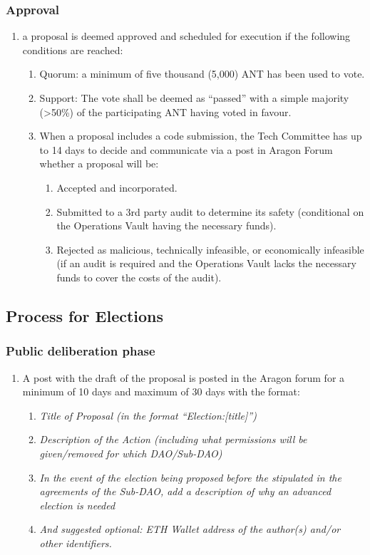 \subsubsection*{Approval} 
\begin{enumerate}
	\item a proposal is deemed approved and scheduled for execution if the following conditions are reached:
	\begin{enumerate}
		\item Quorum: a minimum of five thousand (5,000) \ac{ANT} has been used to vote.
		\item  Support: The vote shall be deemed as “passed” with a simple majority (>50\%) of the participating \ac{ANT} having voted in favour.
		\item When a proposal includes a code submission, the Tech Committee has up to 14 days to decide and communicate via a post in Aragon Forum whether a proposal will be:
		\begin{enumerate}
			\item Accepted and incorporated.
			\item Submitted to a 3rd party audit to determine its safety (conditional on the Operations Vault having the necessary funds).
			\item Rejected as malicious, technically infeasible, or economically infeasible (if an audit is required and the Operations Vault lacks the necessary funds to cover the costs of the audit).
		\end{enumerate}
	\end{enumerate}
\end{enumerate}


\subsection{Process for Elections}

\subsubsection*{Public deliberation phase} 
\begin{enumerate}
	\item A post with the draft of the proposal is posted in the Aragon forum for a minimum of 10 days and maximum of 30 days with the format:
	\begin{enumerate}
		\item \textit{Title of Proposal (in the format “Election:[title]”)}
		\item \textit{Description of the Action (including what permissions will be given/removed for which \ac{DAO}/Sub-\ac{DAO})}
		\item \textit{In the event of the election being proposed before the stipulated in the agreements of the Sub-\ac{DAO}, add a description of why an advanced election is needed}
		\item \textit{And suggested optional: ETH Wallet address of the author(s) and/or other identifiers.}
	\end{enumerate}
\end{enumerate}

